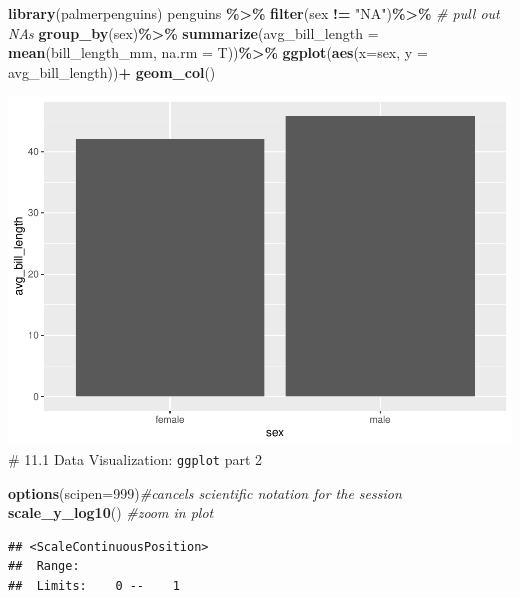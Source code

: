 \documentclass[
]{article}
\newenvironment{Shaded}{\begin{snugshade}}{\end{snugshade}}
\newcommand{\AttributeTok}[1]{\textcolor[rgb]{0.13,0.29,0.53}{#1}}
\newcommand{\CommentTok}[1]{\textcolor[rgb]{0.56,0.35,0.01}{\textit{#1}}}
\newcommand{\DecValTok}[1]{\textcolor[rgb]{0.00,0.00,0.81}{#1}}
\newcommand{\FunctionTok}[1]{\textcolor[rgb]{0.13,0.29,0.53}{\textbf{#1}}}
\newcommand{\NormalTok}[1]{#1}
\newcommand{\SpecialCharTok}[1]{\textcolor[rgb]{0.81,0.36,0.00}{\textbf{#1}}}
\newcommand{\StringTok}[1]{\textcolor[rgb]{0.31,0.60,0.02}{#1}}
\begin{document}
\begin{Shaded}
\begin{Highlighting}[]
\FunctionTok{library}\NormalTok{(palmerpenguins)}
\NormalTok{penguins }\SpecialCharTok{\%\textgreater{}\%} 
  \FunctionTok{filter}\NormalTok{(sex }\SpecialCharTok{!=} \StringTok{"NA"}\NormalTok{)}\SpecialCharTok{\%\textgreater{}\%} \CommentTok{\# pull out NAs}
  \FunctionTok{group\_by}\NormalTok{(sex)}\SpecialCharTok{\%\textgreater{}\%}
  \FunctionTok{summarize}\NormalTok{(}\AttributeTok{avg\_bill\_length =} \FunctionTok{mean}\NormalTok{(bill\_length\_mm, }\AttributeTok{na.rm =}\NormalTok{ T))}\SpecialCharTok{\%\textgreater{}\%} 
  \FunctionTok{ggplot}\NormalTok{(}\FunctionTok{aes}\NormalTok{(}\AttributeTok{x=}\NormalTok{sex, }\AttributeTok{y =}\NormalTok{ avg\_bill\_length))}\SpecialCharTok{+}
  \FunctionTok{geom\_col}\NormalTok{()}
\end{Highlighting}
\end{Shaded}

\includegraphics{Untitled_files/figure-latex/unnamed-chunk-24-1.pdf} \#
11.1 Data Visualization: \texttt{ggplot} part 2

\begin{Shaded}
\begin{Highlighting}[]
\FunctionTok{options}\NormalTok{(}\AttributeTok{scipen=}\DecValTok{999}\NormalTok{)}\CommentTok{\#cancels scientific notation for the session}
\FunctionTok{scale\_y\_log10}\NormalTok{() }\CommentTok{\#zoom in plot}
\end{Highlighting}
\end{Shaded}

\begin{verbatim}
## <ScaleContinuousPosition>
##  Range:  
##  Limits:    0 --    1
\end{verbatim}
\end{document}
